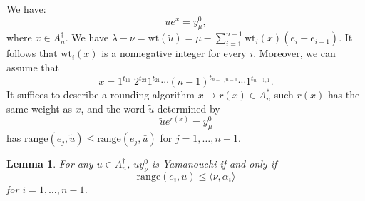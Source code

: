 \documentclass[12pt]{amsproc}
\newcommand{\range}{\mathrm{range}}
\newcommand{\wt}{\mathrm{wt}}
\newtheorem{lemma}[theorem]{Lemma}
\theoremstyle{definition}
\begin{document}
We have:
\begin{displaymath}
  \bar u e^x=y_\mu^0,
\end{displaymath}
where $x\in A_n^\dagger$.
We have $\lambda-\nu=\wt(\tilde u) = \mu-\sum_{i=1}^{n-1}\wt_i(x)(e_i-e_{i+1})$.
It follows that $\wt_i(x)$ is a nonnegative integer for every $i$.
Moreover, we can assume that
\begin{displaymath}
  x = 1^{t_{11}}\;2^{t_{22}}1^{t_{21}}\dotsb (n-1)^{t_{n-1,n-1}}\dotsb 1^{t_{n-1,1}}.
\end{displaymath}
It suffices to describe a rounding algorithm $x\mapsto r(x)\in A_n^*$ such $r(x)$ has the same weight as $x$, and the word $\tilde u$ determined by
\begin{displaymath}
  \tilde u e^{r(x)}=y_\mu^0
\end{displaymath}
has $\range(e_j,\tilde u)\leq \range(e_j,\bar u)$ for $j=1,\dotsc,n-1$.
\begin{lemma}
  For any $u\in A_n^\dagger$, $uy^0_\nu$ is Yamanouchi if and only if
  \begin{displaymath}
    \range(e_i,u)\leq \langle\nu,\alpha_i\rangle
  \end{displaymath}
  for $i=1,\dotsc,n-1$.
\end{lemma}
\end{document}
